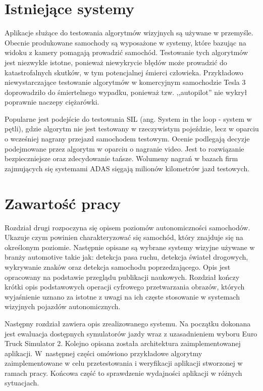 \section{Istniejące systemy}
Aplikacje służące do testowania algorytmów wizyjnych są używane w przemyśle. 
Obecnie produkowane samochody są wyposażone w systemy, które bazując na widoku z kamery pomagają prowadzić samochód. 
Testowanie tych algorytmów jest niezwykle istotne, ponieważ niewykrycie błędów może prowadzić do katastrofalnych skutków, w tym potencjalnej śmierci człowieka. 
Przykładowo niewystarczające testowanie algorytmów w komercyjnym samochodzie Tesla 3 doprowadziło do śmiertelnego wypadku, ponieważ tzw. ,,autopilot'' nie wykrył poprawnie naczepy ciężarówki.

Popularne jest podejście do testowania SIL (ang. System in the loop - system w pętli), gdzie algorytm nie jest testowany w rzeczywistym pojeździe, lecz w oparciu o wcześniej nagrany przejazd samochodem testowym. Ocenie podlegają decyzje podejmowane przez algorytm w oparciu o nagranie video. Jest to rozwiązanie bezpieczniejsze oraz zdecydowanie tańsze. Wolumeny nagrań w bazach firm zajmujących się systemami ADAS sięgają milionów kilometrów jazd testowych.

\section{Zawartość pracy}

Rozdział drugi rozpoczyna się opisem poziomów autonomiczności samochodów. 
Ukazuje czym powinien charakteryzować się samochód, który znajduje się na określonym poziomie.
Następnie opisane są wybrane systemy wizyjne używane w branży automotive takie jak: detekcja pasa ruchu, detekcja świateł drogowych, wykrywanie znaków oraz detekcja samochodu poprzedzającego.
Opis jest opracowany na podstawie przeglądu publikacji naukowych.
Rozdział kończy krótki opis podstawowych operacji cyfrowego przetwarzania obrazów, których wyjaśnienie uznano za istotne z uwagi na ich częste stosowanie w systemach wizyjnych pojazdów autonomicznych.

Następny rozdział zawiera opis zrealizowanego systemu. 
Na początku dokonana jest ewaluacja dostępnych symulatorów jazdy wraz z uzasadnieniem wyboru Euro Truck Simulator 2. 
Kolejno opisana została architektura zaimplementowanej aplikacji. 
W~następnej części omówiono przykładowe algorytmy zaimplementowane w celu przetestowania i weryfikacji aplikacji stworzonej w ramach pracy. 
Końcowa część to sprawdzenie wydajności aplikacji w różnych sytuacjach.

